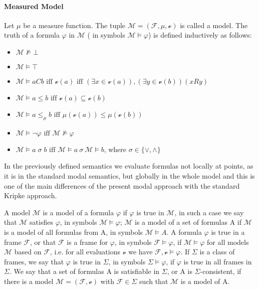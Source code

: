 \documentclass{article}
\begin{document}
	\paragraph{Measured Model}
		\label{measured-model} 
		Let $\mu$ be a measure function. The tuple $\mathcal{M} = (\mathcal{F}, \mu, \mathscr{v})$ is called a model. The truth of a formula $\varphi$ in $\mathcal{M}$ ( in symbols $\mathcal{M} \models \varphi$) is defined inductively as follows:
		\begin{itemize}
			\item $\mathcal{M} \not\models \bot$ 
			\item $\mathcal{M} \models \top$
			\item $\mathcal{M} \models aCb \text{ iff } \mathscr{v}(a) \text{ iff } (\exists x \in \mathscr{v}(a)), (\exists y \in \mathscr{v}(b)) (xRy)$
			\item $\mathcal{M} \models a \leq b \text{ iff } \mathscr{v}(a) \subseteq \mathscr{v}(b)$
			\item $\mathcal{M} \models a \leq_\mu b \text{ iff } \mu(\mathscr{v}(a)) \le \mu(\mathscr{v}(b))$
			\item $\mathcal{M} \models \neg \varphi \text{ iff } \mathcal{M} \not\models \varphi$
			\item $\mathcal{M} \models a \; \sigma \; b \text{ iff } \mathcal{M} \models a \: \sigma \: \mathcal{M} \models b$, where $\sigma \in \{ \vee, \wedge \}$
		\end{itemize}
In the previously defined semantics we evaluate formulas not locally at points, as it is in the standard modal semantics, but globally in the whole model and this is one of the main differences of the present modal approach with the standard Kripke approach.

A model $\mathcal{M}$ is a model of a formula $\varphi$ if $\varphi$ is true in $\mathcal{M}$, in such a case we say that $\mathcal{M}$ satisfies $\varphi$, in symbols $\mathcal{M} \models \varphi$;
$\mathcal{M}$ is a model of a set of formulas A if $\mathcal{M}$ is a model of all formulas from A, in symbols $\mathcal{M} \models A$. A formula $\varphi$ is true in a frame $\mathcal{F}$, or that $\mathcal{F}$ is a frame for $\varphi$, in symbols $\mathcal{F} \models \varphi$,
if $\mathcal{M} \models \varphi$ for all models $\mathcal{M}$ based on $\mathcal{F}$, i.e. for all evaluations $\mathscr{v}$ we have $\mathcal{F}, \mathscr{v} \models \varphi$.
If $\Sigma$ is a class of frames, we say that $\varphi$ is true in $\Sigma$, in symbols $\Sigma \models \varphi$, if $\varphi$ is true in all frames in $\Sigma$. We say that a set of 
formulas A is satisfiable in $\Sigma$, or A is $\Sigma$-consistent, if there is a model $\mathcal{M} = (\mathcal{F}, \mathscr{v})$ with $\mathcal{F} \in \Sigma$ such that $\mathcal{M}$
is a model of A.
\end{document}
